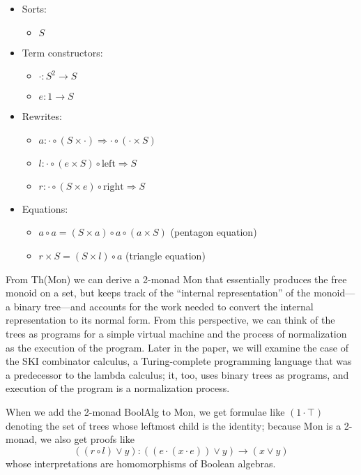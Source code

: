 \documentclass{article}
\newcommand{\maps}{\colon}
\renewcommand{\left}{\mathrm{left}}
\renewcommand{\right}{\mathrm{right}}
\begin{document}
\begin{center}
  \begin{itemize}
    \item Sorts:
    \begin{itemize}
      \item $S$
    \end{itemize}
    \item Term constructors:
    \begin{itemize}
      \item $\cdot\maps S^2 \to S$
      \item $e\maps 1 \to S$
    \end{itemize}
    \item Rewrites:
    \begin{itemize}
      \item $a\maps \cdot \circ (S \times \cdot) \Rightarrow \cdot \circ (\cdot \times S)$
      \item $l\maps \cdot \circ (e \times S) \circ \left \Rightarrow S$
      \item $r\maps \cdot \circ (S \times e) \circ \right \Rightarrow S$
    \end{itemize}
    \item Equations:
    \begin{itemize}
      \item $a \circ a = (S \times a) \circ a \circ (a \times S)$ (pentagon equation)
      \item $r \times S = (S \times l) \circ a$ (triangle equation)
    \end{itemize}
  \end{itemize}
\end{center}
From Th(Mon) we can derive a 2-monad Mon that essentially produces the free monoid on a set, but keeps track of the ``internal representation'' of the monoid---a binary tree---and accounts for the work needed to convert the internal representation to its normal form.  From this perspective, we can think of the trees as programs for a simple virtual machine and the process of normalization as the execution of the program.  Later in the paper, we will examine the case of the SKI combinator calculus, a Turing-complete programming language that was a predecessor to the lambda calculus; it, too, uses binary trees as programs, and execution of the program is a normalization process.

When we add the 2-monad BoolAlg to Mon, we get formulae like $(1 \cdot \top)$ denoting the set of trees whose leftmost child is the identity; because Mon is a 2-monad, we also get proofs like 
\[ ((r \circ l) \lor y)\maps ((e \cdot (x \cdot e)) \lor y) \to (x \lor y) \]
whose interpretations are homomorphisms of Boolean algebras.
\end{document}
